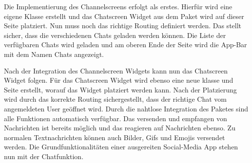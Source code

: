 \noindent
Die Implementierung des Channelscreens erfolgt als erstes. Hierfür wird eine eigene Klasse erstellt und das Chatscreen Widget aus dem Paket wird auf dieser Seite platziert. Nun muss noch das richtige Routing definiert werden. Das stellt sicher, dass die verschiedenen Chats geladen werden können. Die Liste der verfügbaren Chats wird geladen und am oberen Ende der Seite wird die App-Bar mit dem Namen Chats angezeigt.

\noindent
Nach der Integration des Channelscreen Widgets kann nun das Chatscreen Widget folgen. Für das Chatscreen Widget wird ebenso eine neue klasse und Seite erstellt, worauf das Widget platziert werden kann. Nach der Platzierung wird durch das korrekte Routing sichergestellt, dass der richtige Chat vom angemeldeten User geöffnet wird. Durch die nahtlose Integration des Paketes sind alle Funktionen automatisch verfügbar. Das versenden und empfangen von Nachrichten ist bereits möglich und das reagieren auf Nachrichten ebenso. Zu normalen Textnachrichten können auch Bilder, Gifs und Emojis versendet werden. Die Grundfunktionalitäten einer ausgereiten Social-Media App stehen nun mit der Chatfunktion.